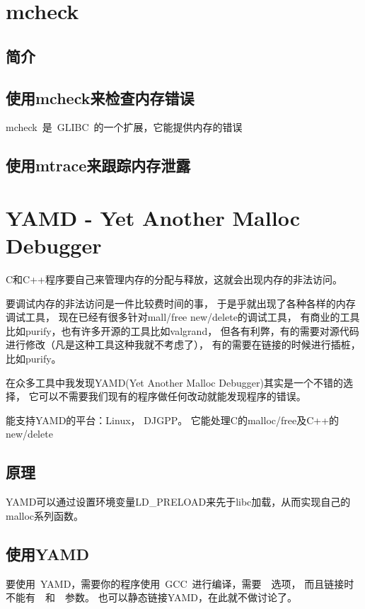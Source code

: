 \section{mcheck} 
\subsection{简介}
\subsection{使用mcheck来检查内存错误}
mcheck~是~GLIBC~的一个扩展，它能提供内存的错误
\subsection{使用mtrace来跟踪内存泄露}

\section{YAMD - Yet Another Malloc Debugger}

\label{yamd}

C和C++程序要自己来管理内存的分配与释放，这就会出现内存的非法访问。

要调试内存的非法访问是一件比较费时间的事，
于是乎就出现了各种各样的内存调试工具，
现在已经有很多针对mall/free new/delete的调试工具，
有商业的工具比如purify，也有许多开源的工具比如valgrand，
但各有利弊，有的需要对源代码进行修改（凡是这种工具这种我就不考虑了），
有的需要在链接的时候进行插桩，比如purify。

在众多工具中我发现YAMD(Yet Another Malloc Debugger)其实是一个不错的选择，
它可以不需要我们现有的程序做任何改动就能发现程序的错误。

能支持YAMD的平台：Linux， DJGPP。 它能处理C的malloc/free及C++的new/delete

\subsection{原理}

YAMD可以通过设置环境变量LD\_PRELOAD来先于libc加载，从而实现自己的malloc系列函数。

\subsection{使用YAMD}

要使用~YAMD，需要你的程序使用~GCC~进行编译，需要~~选项，
而且链接时不能有~~和~~参数。
也可以静态链接YAMD，在此就不做讨论了。

